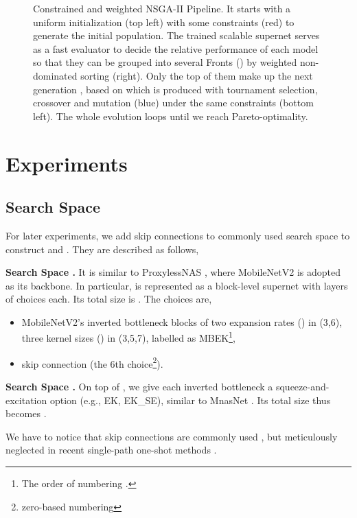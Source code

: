 \documentclass[runningheads]{llncs}
\begin{document}
\begin{figure}[ht]
	\centering
\caption{Constrained and weighted NSGA-II Pipeline. It starts with a uniform initialization (top left) with some constraints (red) to generate the initial population. The trained scalable supernet serves as a fast evaluator to decide the relative performance of each model so that they can be grouped into several Fronts () by weighted non-dominated sorting (right). Only the top  of them make up the next generation , based on which  is produced with tournament selection, crossover and mutation (blue) under the same constraints (bottom left). The whole evolution loops until we reach Pareto-optimality.}
	\label{fig:nas-pipeline}
\end{figure}

\section{Experiments}

\subsection{Search Space}\label{sec:ss}
For later experiments, we add skip connections to commonly used search space to construct   and . They are described as follows,

\textbf{Search Space .} It is similar to ProxylessNAS  \cite{cai2018proxylessnas}, where MobileNetV2 \cite{sandler2018mobilenetv2} is adopted as its backbone. In particular,  is represented as a block-level supernet with  layers of  choices each. Its total size is . The choices are,

\begin{itemize}
	\item MobileNetV2's inverted bottleneck blocks \cite{sandler2018mobilenetv2} of two expansion rates () in (3,6), three kernel sizes () in (3,5,7), labelled as MBEK\footnote{The order of numbering  .}, 
	\item skip connection (the 6th choice\footnote{zero-based numbering}).
\end{itemize}

\textbf{Search Space .} On top of , we give each inverted bottleneck a squeeze-and-excitation \cite{hu2018squeeze} option (e.g., EK, EK\_SE), similar to MnasNet \cite{tan2018mnasnet}. Its total size thus becomes .

We have to notice that skip connections are commonly used \cite{tan2018mnasnet,liu2018darts,bender2018understanding}, but meticulously neglected in recent single-path one-shot methods \cite{guo2019single,chu2019fairnas}. 
\end{document}
